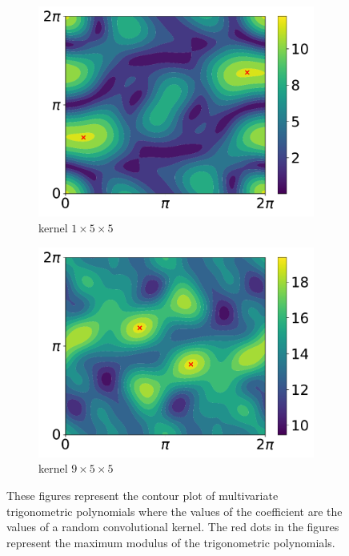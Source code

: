 \begin{figure}[htb]
  \begin{subfigure}[b]{.49\textwidth}
    \centering
    \includegraphics[scale=0.35]{figures/main/ch5-lipschitz_regularization/contour_poly_200_1_1_5.pdf}
    \caption{kernel $1\times5\times5$}
  \end{subfigure}
  \begin{subfigure}[b]{.49\textwidth}
    \centering
    \includegraphics[scale=0.35]{figures/main/ch5-lipschitz_regularization/contour_poly_200_1_9_5.pdf}
    \caption{kernel $9\times5\times5$}
  \end{subfigure}
  \caption{These figures represent the contour plot of multivariate trigonometric polynomials where the values of the coefficient are the values of a random convolutional kernel. The red dots in the figures represent the maximum modulus of the trigonometric polynomials.}
  \label{figure:contour_plot_trigonometric_polynomials}
\end{figure}%



